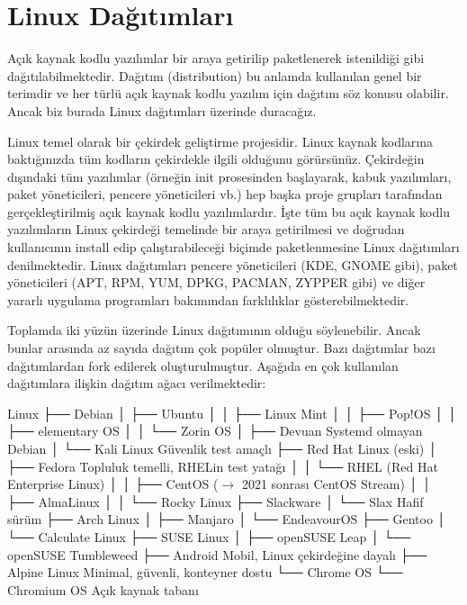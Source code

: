\documentclass[a4paper,10pt,turkish]{sphinxmanual}
\begin{document}
\section{Linux Dağıtımları}
\label{\detokenize{introduction:linux-dagitimlari}}
\sphinxAtStartPar
Açık kaynak kodlu yazılımlar bir araya getirilip paketlenerek istenildiği gibi
dağıtılabilmektedir. Dağıtım (distribution) bu anlamda kullanılan genel bir terimdir ve
her türlü açık kaynak kodlu yazılım için dağıtım söz konusu olabilir. Ancak biz burada
Linux dağıtımları üzerinde duracağız.

\sphinxAtStartPar
Linux temel olarak bir çekirdek geliştirme projesidir. Linux kaynak kodlarına baktığınızda
tüm kodların çekirdekle ilgili olduğunu görürsünüz. Çekirdeğin dışındaki tüm yazılımlar
(örneğin init prosesinden başlayarak, kabuk yazılımları, paket yöneticileri, pencere
yöneticileri vb.) hep başka proje grupları tarafından gerçekleştirilmiş açık kaynak kodlu
yazılımlardır. İşte tüm bu açık kaynak kodlu yazılımların Linux çekirdeği temelinde bir
araya getirilmesi ve doğrudan kullanıcının install edip çalıştırabileceği biçimde
paketlenmesine Linux dağıtımları denilmektedir. Linux dağıtımları pencere yöneticileri
(KDE, GNOME gibi), paket yöneticileri (APT, RPM, YUM, DPKG, PACMAN, ZYPPER gibi) ve
diğer yararlı uygulama programları bakımından farklılıklar gösterebilmektedir.

\sphinxAtStartPar
Toplamda iki yüzün üzerinde Linux dağıtımının olduğu söylenebilir. Ancak bunlar arasında
az sayıda dağıtım çok popüler olmuştur. Bazı dağıtımlar bazı dağıtımlardan fork edilerek
oluşturulmuştur. Aşağıda en çok kullanılan dağıtımlara ilişkin dağıtım ağacı verilmektedir:

\begin{sphinxVerbatim}[commandchars=\\\{\}]
Linux
├── Debian
│   ├── Ubuntu
│   │   ├── Linux Mint
│   │   ├── Pop!\PYGZus{}OS
│   │   ├── elementary OS
│   │   └── Zorin OS
│   ├── Devuan       \PYGZsh{} Systemd olmayan Debian
│   └── Kali Linux   \PYGZsh{} Güvenlik test amaçlı
├── Red Hat Linux (eski)
│   ├── Fedora       \PYGZsh{} Topluluk temelli, RHEL\PYGZsq{}in test yatağı
│   │   └── RHEL (Red Hat Enterprise Linux)
│   │       ├── CentOS (\(\rightarrow\) 2021 sonrası CentOS Stream)
│   │       ├── AlmaLinux
│   │       └── Rocky Linux
├── Slackware
│   └── Slax         \PYGZsh{} Hafif sürüm
├── Arch Linux
│   ├── Manjaro
│   └── EndeavourOS
├── Gentoo
│   └── Calculate Linux
├── SUSE Linux
│   ├── openSUSE Leap
│   └── openSUSE Tumbleweed
├── Android          \PYGZsh{} Mobil, Linux çekirdeğine dayalı
├── Alpine Linux     \PYGZsh{} Minimal, güvenli, konteyner dostu
└── Chrome OS
    └── Chromium OS  \PYGZsh{} Açık kaynak tabanı
\end{sphinxVerbatim}
\end{document}
